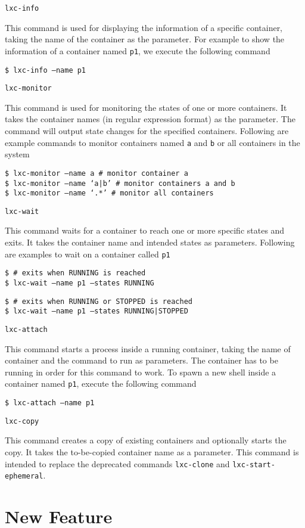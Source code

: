 \documentclass[12pt]{article}
\begin{document}
{\texttt{lxc-info}
\begin{dent}
This command is used for displaying the information of a specific container, taking the name of the container as the parameter. For example to show the information of a container named \texttt{p1}, we execute the following command

\texttt{\$ lxc-info --name p1}
\end{dent}


\texttt{lxc-monitor}
\begin{dent}
This command is used for monitoring the states of one or more containers. It takes the container names (in regular expression format) as the parameter. The command will output state changes for the specified containers. Following are example commands to monitor containers named \texttt{a} and \texttt{b} or all containers in the system

\texttt{\$ lxc-monitor --name a \# monitor container a}\\
\texttt{\$ lxc-monitor --name `a|b' \# monitor containers a and b}\\
\texttt{\$ lxc-monitor --name `.*' \# monitor all containers}
\end{dent}


\texttt{lxc-wait}
\begin{dent}
This command waits for a container to reach one or more specific states and exits. It takes the container name and intended states as parameters. Following are examples to wait on a container called \texttt{p1}

\texttt{\$ \# exits when RUNNING is reached}\\
\texttt{\$ lxc-wait --name p1 --states RUNNING}

\texttt{\$ \# exits when RUNNING or STOPPED is reached}\\
\texttt{\$ lxc-wait --name p1 --states RUNNING|STOPPED}
\end{dent}


\texttt{lxc-attach}
\begin{dent}
This command starts a process inside a running container, taking the name of container and the command to run as parameters. The container has to be running in order for this command to work. To spawn a new shell inside a container named \texttt{p1}, execute the following command

\texttt{\$ lxc-attach --name p1}
\end{dent}


\texttt{lxc-copy}
\begin{dent}
This command creates a copy of existing containers and optionally starts the copy. It takes the to-be-copied container name as a parameter. This command is intended to replace the deprecated commands \texttt{lxc-clone} and \texttt{lxc-start-ephemeral}.
\end{dent}
} %


\section{New Feature}
\end{document}
